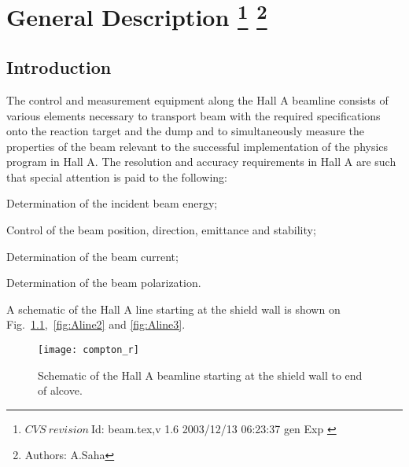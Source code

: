 \chapter[General Description]{General Description
\footnote{
  $CVS~revision~ $Id: beam.tex,v 1.6 2003/12/13 06:23:37 gen Exp $ $
}
\footnote{Authors: A.Saha }
}
\section{Introduction}


The control and measurement equipment along the Hall A beamline consists of 
various elements necessary to transport beam with the required specifications 
onto the reaction target and the dump and to simultaneously measure the 
properties of the beam relevant to the successful implementation of the 
physics program in Hall A.  The resolution and accuracy requirements in Hall 
A are such that special attention is paid to the following:
\begin{list}{.~}{\setlength{\itemsep}{-0.15cm}}
  \item Determination of the incident beam energy;
  \item Control of the beam position, direction, emittance and stability;
  \item Determination of the beam current;
  \item Determination of the beam polarization.
\end{list}

A schematic of the Hall A line starting at the shield wall is
shown on Fig.~\ref{fig:Aline1},~\ref{fig:Aline2} and \ref{fig:Aline3}. 

\begin{figure}
\begin{center}
\texttt{[image: compton\_r]}
\caption[Beamline: Hall A Beamline Overview]{Schematic of the Hall A beamline
starting at the shield wall to end of alcove.}
\label{fig:Aline1}
\end{center}
\end{figure}


